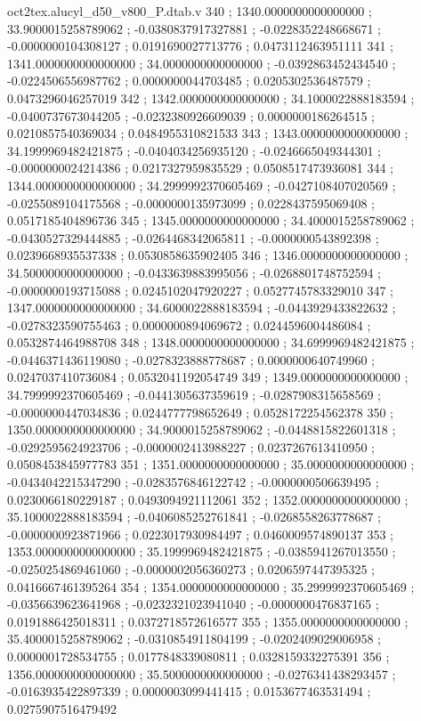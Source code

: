 \begin{filecontents}[overwrite]{oct2tex.alucyl_d50_v800_P.dtab.v}
340 ; 1340.0000000000000000 ; 33.9000015258789062 ; -0.0380837917327881 ; -0.0228352248668671 ; -0.0000000104308127 ; 0.0191690027713776 ; 0.0473112463951111
341 ; 1341.0000000000000000 ; 34.0000000000000000 ; -0.0392863452434540 ; -0.0224506556987762 ; 0.0000000044703485 ; 0.0205302536487579 ; 0.0473296046257019
342 ; 1342.0000000000000000 ; 34.1000022888183594 ; -0.0400737673044205 ; -0.0232380926609039 ; 0.0000000186264515 ; 0.0210857540369034 ; 0.0484955310821533
343 ; 1343.0000000000000000 ; 34.1999969482421875 ; -0.0404034256935120 ; -0.0246665049344301 ; -0.0000000024214386 ; 0.0217327959835529 ; 0.0508517473936081
344 ; 1344.0000000000000000 ; 34.2999992370605469 ; -0.0427108407020569 ; -0.0255089104175568 ; -0.0000000135973099 ; 0.0228437595069408 ; 0.0517185404896736
345 ; 1345.0000000000000000 ; 34.4000015258789062 ; -0.0430527329444885 ; -0.0264468342065811 ; -0.0000000543892398 ; 0.0239668935537338 ; 0.0530858635902405
346 ; 1346.0000000000000000 ; 34.5000000000000000 ; -0.0433639883995056 ; -0.0268801748752594 ; -0.0000000193715088 ; 0.0245102047920227 ; 0.0527745783329010
347 ; 1347.0000000000000000 ; 34.6000022888183594 ; -0.0443929433822632 ; -0.0278323590755463 ; 0.0000000894069672 ; 0.0244596004486084 ; 0.0532874464988708
348 ; 1348.0000000000000000 ; 34.6999969482421875 ; -0.0446371436119080 ; -0.0278323888778687 ; 0.0000000640749960 ; 0.0247037410736084 ; 0.0532041192054749
349 ; 1349.0000000000000000 ; 34.7999992370605469 ; -0.0441305637359619 ; -0.0287908315658569 ; -0.0000000447034836 ; 0.0244777798652649 ; 0.0528172254562378
350 ; 1350.0000000000000000 ; 34.9000015258789062 ; -0.0448815822601318 ; -0.0292595624923706 ; -0.0000002413988227 ; 0.0237267613410950 ; 0.0508453845977783
351 ; 1351.0000000000000000 ; 35.0000000000000000 ; -0.0434042215347290 ; -0.0283576846122742 ; -0.0000000506639495 ; 0.0230066180229187 ; 0.0493094921112061
352 ; 1352.0000000000000000 ; 35.1000022888183594 ; -0.0406085252761841 ; -0.0268558263778687 ; -0.0000000923871966 ; 0.0223017930984497 ; 0.0460009574890137
353 ; 1353.0000000000000000 ; 35.1999969482421875 ; -0.0385941267013550 ; -0.0250254869461060 ; -0.0000002056360273 ; 0.0206597447395325 ; 0.0416667461395264
354 ; 1354.0000000000000000 ; 35.2999992370605469 ; -0.0356639623641968 ; -0.0232321023941040 ; -0.0000000476837165 ; 0.0191886425018311 ; 0.0372718572616577
355 ; 1355.0000000000000000 ; 35.4000015258789062 ; -0.0310854911804199 ; -0.0202409029006958 ; 0.0000001728534755 ; 0.0177848339080811 ; 0.0328159332275391
356 ; 1356.0000000000000000 ; 35.5000000000000000 ; -0.0276341438293457 ; -0.0163935422897339 ; 0.0000003099441415 ; 0.0153677463531494 ; 0.0275907516479492

\end{filecontents}
